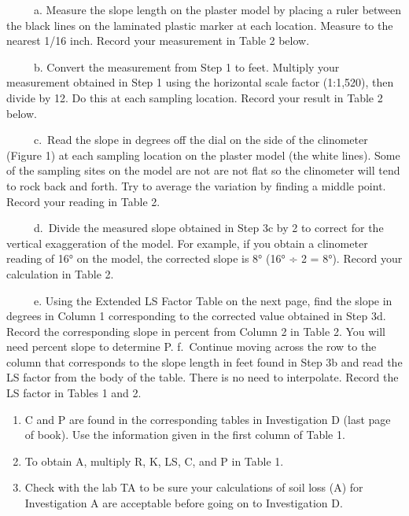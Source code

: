 \documentclass[
  letterpaper,
  twocolumn,
  portrait]{scrbook}
\begin{document}
~~~~~a. Measure the slope length on the plaster model by placing a ruler
between the black lines on the laminated plastic marker at each
location. Measure to the nearest 1/16 inch. Record your measurement in
Table 2 below.

~~~~~b. Convert the measurement from Step 1 to feet. Multiply your
measurement obtained in Step 1 using the horizontal scale factor
(1:1,520), then divide by 12. Do this at each sampling location. Record
your result in Table 2 below.

~~~~~c.~Read the slope in degrees off the dial on the side of the
clinometer (Figure 1) at each sampling location on the plaster model
(the white lines). Some of the sampling sites on the model are not are
not flat so the clinometer will tend to rock back and forth. Try to
average the variation by finding a middle point. Record your reading in
Table 2.

~~~~~d.~Divide the measured slope obtained in Step 3c by 2 to correct
for the vertical exaggeration of the model. For example, if you obtain a
clinometer reading of 16° on the model, the corrected slope is 8° (16° ÷
2 = 8°). Record your calculation in Table 2.

~~~~~e. Using the Extended LS Factor Table on the next page, find the
slope in degrees in Column 1 corresponding to the corrected value
obtained in Step 3d. Record the corresponding slope in percent from
Column 2 in Table 2. You will need percent slope to determine P.
f.~Continue moving across the row to the column that corresponds to the
slope length in feet found in Step 3b and read the LS factor from the
body of the table. There is no need to interpolate. Record the LS factor
in Tables 1 and 2.

\begin{enumerate}
\def\labelenumi{\arabic{enumi}.}
\setcounter{enumi}{3}
\item
  C and P are found in the corresponding tables in Investigation D (last
  page of book). Use the information given in the first column of Table
  1.
\item
  To obtain A, multiply R, K, LS, C, and P in Table 1.
\item
  Check with the lab TA to be sure your calculations of soil loss (A)
  for Investigation A are acceptable before going on to Investigation D.
\end{enumerate}

 
  \providecommand{\huxb}[2]{\arrayrulecolor[RGB]{#1}\global\arrayrulewidth=#2pt}
  \providecommand{\huxvb}[2]{\color[RGB]{#1}\vrule width #2pt}
  \providecommand{\huxtpad}[1]{\rule{0pt}{#1}}
  \providecommand{\huxbpad}[1]{\rule[-#1]{0pt}{#1}}
\end{document}
